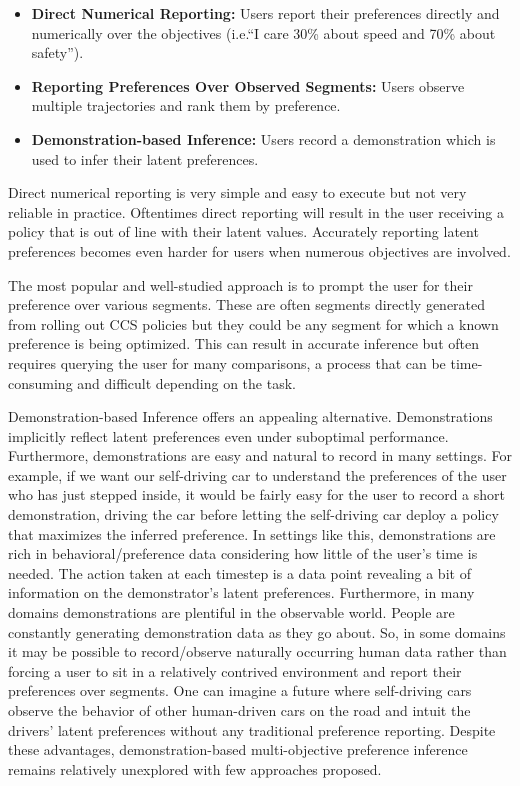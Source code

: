 \documentclass[11pt]{article}
\begin{document}
\begin{itemize}
    \item \textbf{Direct Numerical Reporting:} Users report their preferences directly and numerically over the objectives (i.e.``I care 30\% about speed and 70\% about safety'').
    \item \textbf{Reporting Preferences Over Observed Segments:} Users observe multiple trajectories and rank them by preference.
    \item \textbf{Demonstration-based Inference:} Users record a demonstration which is used to infer their latent preferences.
\end{itemize}

Direct numerical reporting is very simple and easy to execute but not very reliable in practice. Oftentimes direct reporting will result in the user receiving a policy that is out of line with their latent values. Accurately reporting latent preferences becomes even harder for users when numerous objectives are involved.

The most popular and well-studied approach is to prompt the user for their preference over various segments. These are often segments directly generated from rolling out CCS policies but they could be any segment for which a known preference is being optimized. This can result in accurate inference but often requires querying the user for many comparisons, a process that can be time-consuming and difficult depending on the task.

Demonstration-based Inference offers an appealing alternative. Demonstrations implicitly reflect latent preferences even under suboptimal performance. Furthermore, demonstrations are easy and natural to record in many settings. For example, if we want our self-driving car to understand the preferences of the user who has just stepped inside, it would be fairly easy for the user to record a short demonstration, driving the car before letting the self-driving car deploy a policy that maximizes the inferred preference. In settings like this, demonstrations are rich in behavioral/preference data considering how little of the user's time is needed. The action taken at each timestep is a data point revealing a bit of information on the demonstrator's latent preferences. Furthermore, in many domains demonstrations are plentiful in the observable world. People are constantly generating demonstration data as they go about. So, in some domains it may be possible to record/observe naturally occurring human data rather than forcing a user to sit in a relatively contrived environment and report their preferences over segments. One can imagine a future where self-driving cars observe the behavior of other human-driven cars on the road and intuit the drivers' latent preferences without any traditional preference reporting. Despite these advantages, demonstration-based multi-objective preference inference remains relatively unexplored with few approaches proposed.
\end{document}
